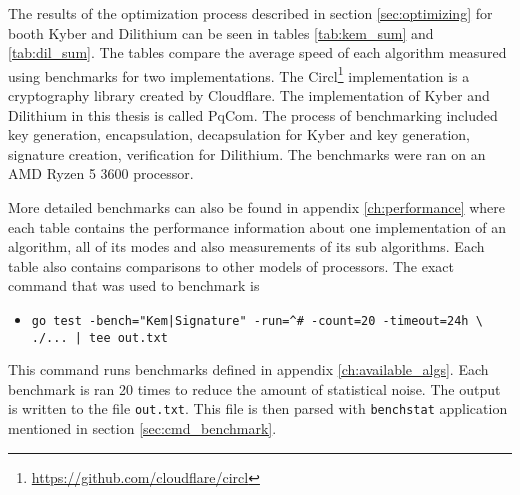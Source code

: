 The results of the optimization process described in section \ref{sec:optimizing} for booth Kyber and Dilithium can be seen in tables \ref{tab:kem_sum} and \ref{tab:dil_sum}. The tables compare the average speed of each algorithm measured using benchmarks for two implementations. The Circl\footnote{\url{https://github.com/cloudflare/circl}} implementation is a cryptography library created by Cloudflare. The implementation of Kyber and Dilithium in this thesis is called PqCom. The process of benchmarking included key generation, encapsulation, decapsulation for Kyber and key generation, signature creation, verification for Dilithium. The benchmarks were ran on an AMD Ryzen 5 3600 processor.


More detailed benchmarks can also be found in appendix \ref{ch:performance} where each table contains the performance information about one implementation of an algorithm, all of its modes and also measurements of its sub algorithms. Each table also contains comparisons to other models of processors. The exact command that was used to benchmark is
\begin{itemize}
  \item \texttt{go test -bench="Kem|Signature" -run=\^{}\# -count=20 -timeout=24h \textbackslash\\ ./... | tee out.txt}
\end{itemize}
This command runs benchmarks defined in appendix \ref{ch:available_algs}. Each benchmark is ran 20 times to reduce the amount of statistical noise. The output is written to the file \texttt{out.txt}. This file is then parsed with \texttt{benchstat} application mentioned in section \ref{sec:cmd_benchmark}.
